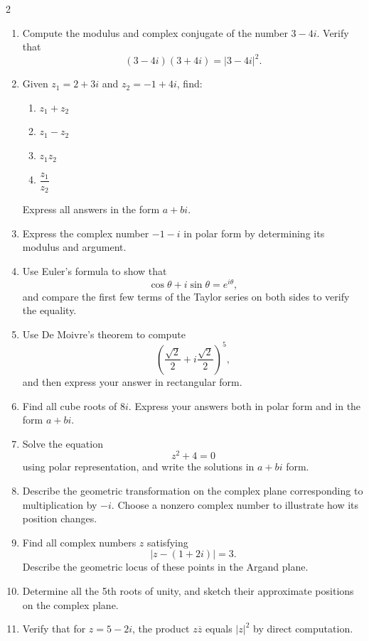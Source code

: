 \begin{multicols}{2}

\begin{enumerate}
\item Compute the modulus and complex conjugate of the number \( 3-4i \). Verify that
\[
(3-4i)(3+4i)=|3-4i|^2.
\]
%
\item Given \( z_1 = 2+3i \) and \( z_2 = -1+4i \), find:
  \begin{enumerate}
    \item \( z_1+z_2 \)
    \item \( z_1-z_2 \)
    \item \( z_1z_2 \)
    \item \( \dfrac{z_1}{z_2} \)
  \end{enumerate}
Express all answers in the form \( a+bi \).

\item Express the complex number \( -1-i \) in polar form by determining its modulus and argument.

\item Use Euler's formula to show that 
\[
\cos\theta+i\sin\theta=e^{i\theta},
\]
and compare the first few terms of the Taylor series on both sides to verify the equality.

\item Use De Moivre's theorem to compute 
\[
\left(\frac{\sqrt{2}}{2}+i\frac{\sqrt{2}}{2}\right)^5,
\]
and then express your answer in rectangular form.

\item Find all cube roots of \( 8i \). Express your answers both in polar form and in the form \( a+bi \).

\item Solve the equation
\[
z^2+4=0
\]
using polar representation, and write the solutions in \( a+bi \) form.

\item Describe the geometric transformation on the complex plane corresponding to multiplication by \(-i\). Choose a nonzero complex number to illustrate how its position changes.

\item Find all complex numbers \( z \) satisfying
\[
|z-(1+2i)|=3.
\]
Describe the geometric locus of these points in the Argand plane.

\item Determine all the 5th roots of unity, and sketch their approximate positions on the complex plane.

\item Verify that for \( z=5-2i \), the product \( z\overline{z} \) equals \( |z|^2 \) by direct computation.


\end{enumerate}
\end{multicols}
